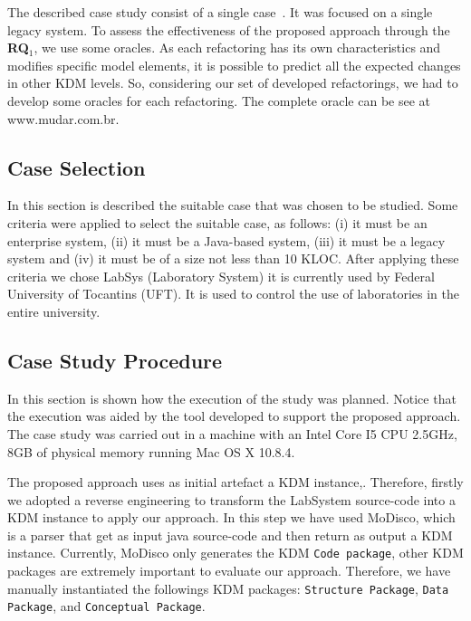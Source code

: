 The described case study consist of a single case~\cite{Brereton:2008}. It was focused on a single legacy system. To assess the effectiveness of the proposed approach through the \textbf{RQ$_1$}, we use some oracles. As each refactoring has its own characteristics and modifies specific model elements, it is possible to predict all the expected changes in other KDM levels. So, considering our set of developed refactorings, we had to develop some oracles for each refactoring. The complete oracle can be see at www.mudar.com.br.

\subsection{Case Selection}

In this section is described the suitable case that was chosen to be studied. Some criteria were applied to select the suitable case, as follows: (i) it must be an enterprise system, (ii) it must be a Java-based system, (iii) it must be a legacy system and (iv) it must be of a size not less than 10 KLOC. After applying these criteria we chose LabSys (Laboratory System) it is currently used by Federal University of Tocantins (UFT). It is used to control the use of laboratories in the entire university. 

\subsection{Case Study Procedure}\label{sec:caseStudyProcedure}

In this section is shown how the execution of the study was planned. Notice that the execution was aided by the tool developed to support the proposed approach. The case study was carried out in a machine with an Intel Core I5 CPU 2.5GHz, 8GB of physical memory running Mac OS X 10.8.4.

The proposed approach uses as initial artefact a KDM instance,. Therefore, firstly we adopted a reverse engineering to  transform the LabSystem source-code into a KDM instance to apply our approach. In this step we have used MoDisco\cite{Brunele20141012}, which is a parser that get as input java source-code and then return as output a KDM instance. Currently, MoDisco only generates the KDM \texttt{Code package}, other KDM packages are extremely important to evaluate our approach. Therefore, we have manually instantiated the followings KDM packages: \texttt{Structure Package}, \texttt{Data Package}, and \texttt{Conceptual Package}.


